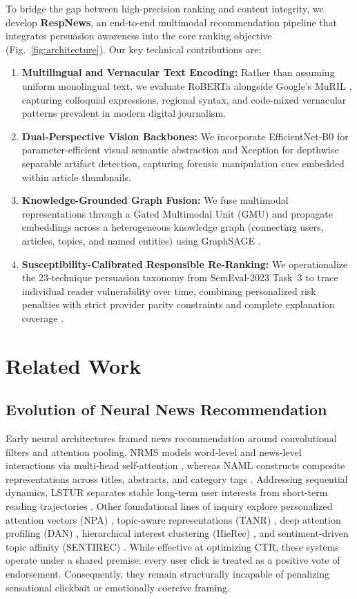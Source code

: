 \documentclass[conference]{IEEEtran}
\begin{document}
To bridge the gap between high-precision ranking and content integrity, we develop \textbf{RespNews}, an end-to-end multimodal recommendation pipeline that integrates persuasion awareness into the core ranking objective (Fig.~\ref{fig:architecture}). Our key technical contributions are:
\begin{enumerate}
    \item \textbf{Multilingual and Vernacular Text Encoding:} Rather than assuming uniform monolingual text, we evaluate RoBERTa \cite{liu_roberta} alongside Google's MuRIL \cite{khanuja_muril}, capturing colloquial expressions, regional syntax, and code-mixed vernacular patterns prevalent in modern digital journalism.
    \item \textbf{Dual-Perspective Vision Backbones:} We incorporate EfficientNet-B0 \cite{tan_efficientnet} for parameter-efficient visual semantic abstraction and Xception \cite{chollet_xception} for depthwise separable artifact detection, capturing forensic manipulation cues embedded within article thumbnails.
    \item \textbf{Knowledge-Grounded Graph Fusion:} We fuse multimodal representations through a Gated Multimodal Unit (GMU) \cite{arevalo_gmu} and propagate embeddings across a heterogeneous knowledge graph (connecting users, articles, topics, and named entities) using GraphSAGE \cite{hamilton_graphsage}.
    \item \textbf{Susceptibility-Calibrated Responsible Re-Ranking:} We operationalize the 23-technique persuasion taxonomy from SemEval-2023 Task~3 \cite{piskorski_semeval} to trace individual reader vulnerability over time, combining personalized risk penalties with strict provider parity constraints \cite{li_profai} and complete explanation coverage \cite{ribeiro_lime}.
\end{enumerate}

\section{Related Work}
\subsection{Evolution of Neural News Recommendation}
Early neural architectures framed news recommendation around convolutional filters and attention pooling. NRMS models word-level and news-level interactions via multi-head self-attention \cite{wu_nrms}, whereas NAML constructs composite representations across titles, abstracts, and category tags \cite{wu_naml}. Addressing sequential dynamics, LSTUR separates stable long-term user interests from short-term reading trajectories \cite{an_lstur}. Other foundational lines of inquiry explore personalized attention vectors (NPA) \cite{wu_npa}, topic-aware representations (TANR) \cite{wu_tanr}, deep attention profiling (DAN) \cite{zhu_dan}, hierarchical interest clustering (HieRec) \cite{qi_hierec}, and sentiment-driven topic affinity (SENTIREC) \cite{ge_sentiment}. While effective at optimizing CTR, these systems operate under a shared premise: every user click is treated as a positive vote of endorsement. Consequently, they remain structurally incapable of penalizing sensational clickbait or emotionally coercive framing.
\end{document}
